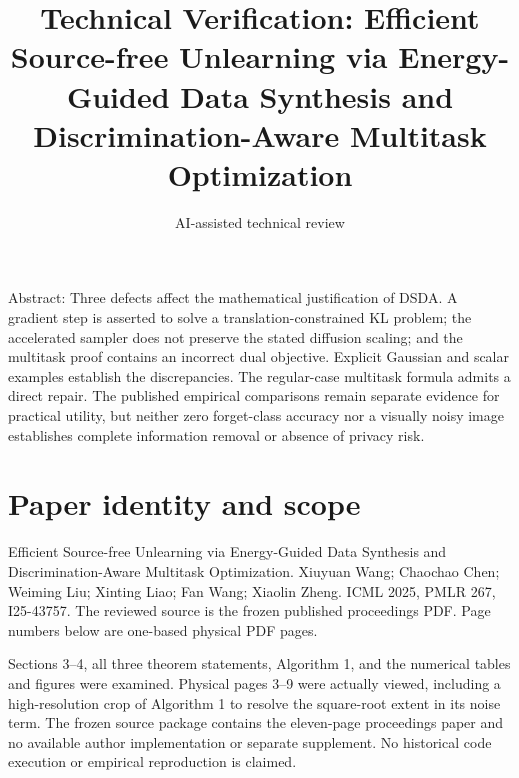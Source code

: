 \documentclass[10pt]{article}
\title{Technical Verification: Efficient Source-free Unlearning via Energy-Guided Data Synthesis and Discrimination-Aware Multitask Optimization}
\author{AI-assisted technical review}
\date{}
\begin{document}
\maketitle
Abstract: Three defects affect the mathematical justification of DSDA. A gradient step is asserted to solve a translation-constrained KL problem; the accelerated sampler does not preserve the stated diffusion scaling; and the multitask proof contains an incorrect dual objective. Explicit Gaussian and scalar examples establish the discrepancies. The regular-case multitask formula admits a direct repair. The published empirical comparisons remain separate evidence for practical utility, but neither zero forget-class accuracy nor a visually noisy image establishes complete information removal or absence of privacy risk.\par
\section*{Paper identity and scope}
Efficient Source-free Unlearning via Energy-Guided Data Synthesis and Discrimination-Aware Multitask Optimization. Xiuyuan Wang; Chaochao Chen; Weiming Liu; Xinting Liao; Fan Wang; Xiaolin Zheng. ICML 2025, PMLR 267, I25-43757. The reviewed source is the frozen published proceedings PDF. Page numbers below are one-based physical PDF pages.\par
Sections 3–4, all three theorem statements, Algorithm 1, and the numerical tables and figures were examined. Physical pages 3–9 were actually viewed, including a high-resolution crop of Algorithm 1 to resolve the square-root extent in its noise term. The frozen source package contains the eleven-page proceedings paper and no available author implementation or separate supplement. No historical code execution or empirical reproduction is claimed.\par
\end{document}
